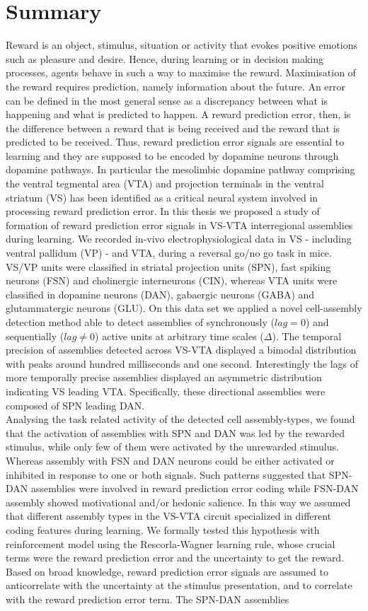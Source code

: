 \section*{Summary}
Reward is an object, stimulus, situation or activity that evokes positive emotions such as pleasure and desire. Hence, during learning or in decision making processes, agents behave in such a way to maximise the reward. Maximisation of the reward requires prediction, namely information about the future. An error can be defined in the most general sense as a discrepancy between what is happening and what is predicted to happen. A reward prediction error, then, is the difference between a reward that is being received and the reward that is predicted to be received. Thus, reward prediction error signals are essential to learning and they are supposed to be encoded by dopamine neurons through dopamine pathways. In particular the mesolimbic dopamine pathway comprising the ventral tegmental area (VTA) and projection terminals in the ventral striatum (VS) has been identified as a critical neural system involved in processing reward prediction error. In this thesis we proposed a study of formation of reward prediction error signals in VS-VTA interregional assemblies during learning. We recorded in-vivo electrophysiological data in VS - including ventral pallidum (VP) - and VTA, during a reversal go/no go task in mice. VS/VP units were classified in striatal projection units (SPN), fast spiking neurons (FSN) and cholinergic interneurons (CIN), whereas VTA units were classified in dopamine neurons (DAN), gabaergic neurons (GABA) and glutammatergic neurons (GLU). On this data set we applied a novel cell-assembly detection method able to detect assemblies of synchronously ($lag=0$) and sequentially ($lag\neq0$) active units at arbitrary time scales ($\Delta$). The temporal precision of assemblies detected across VS-VTA displayed a bimodal distribution with peaks around hundred milliseconds and one second. Interestingly the lags of more temporally precise assemblies displayed an asymmetric distribution indicating VS leading VTA. Specifically, these directional assemblies were composed of SPN leading DAN.\\Analysing the task related activity of the detected cell assembly-types, we found that the activation of assemblies with SPN and DAN was led by the rewarded stimulus, while only few of them were activated by the unrewarded stimulus. Whereas assembly with FSN and DAN neurons could be either activated or inhibited in response to one or both signals. Such patterns suggested that SPN-DAN assemblies were involved in reward prediction error coding while FSN-DAN assembly showed motivational and/or hedonic salience. In this way we assumed that different assembly types in the VS-VTA circuit specialized in different coding features during learning. We formally tested this hypothesis with reinforcement model using the Rescorla-Wagner learning rule, whose crucial terms were the reward prediction error and the uncertainty to get the reward. Based on broad knowledge, reward prediction error signals are assumed to anticorrelate with the uncertainty at the stimulus presentation, and to correlate with the reward prediction error term. The SPN-DAN assemblies 